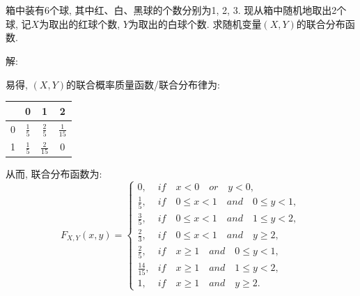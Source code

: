 \documentclass[standard]{ExBook}
\begin{document}
\section{}

\begin{qitems}
    \begin{bbox}
    \begin{shaded}
        \qitem 
箱中装有6个球, 其中红、白、黑球的个数分别为1, 2, 3. 现从箱中随机地取出2个球, 记$X$为取出的红球个数, $Y$为取出的白球个数. 求随机变量$(X,Y)$的联合分布函数.
    \end{shaded}
    \end{bbox}

\vspace{-5em}

    \begin{bbox}
解: 

易得, $(X,Y)$的联合概率质量函数/联合分布律为:
\begin{footnotesize}
\begin{center}
    \renewcommand{\arraystretch}{1.7}
    \setlength{\tabcolsep}{25pt}
    \begin{tabular}{c|c|c|c}
	    \hline
	    \diagbox{$X$}{$P(X,Y)$}{$Y$} & 0 & 1 & 2 \\
	    \hline
	    0 & $\displaystyle\frac{1}{5}$ & $\displaystyle\frac{2}{5}$ & $\displaystyle\frac{1}{15}$\\
	    \hline
	    1 & $\displaystyle\frac{1}{5}$ & $\displaystyle\frac{2}{15}$ & 0\\
	    \hline
    \end{tabular}
\end{center}
\end{footnotesize}
从而, 联合分布函数为:
\[
F_{X,Y}(x, y) = 
\begin{cases} 
0, & if\quad x < 0\quad or\quad y < 0, \\ 
\frac{1}{5}, & if\quad 0 \leq x < 1\quad and\quad 0 \leq y < 1, \\ 
\frac{3}{5}, & if\quad 0 \leq x < 1\quad and\quad 1 \leq y < 2, \\ 
\frac{2}{3}, & if\quad 0 \leq x < 1\quad and\quad y \geq 2, \\ 
\frac{2}{5}, & if\quad x \geq 1\quad and\quad 0 \leq y < 1, \\ 
\frac{14}{15}, & if\quad x \geq 1\quad and\quad 1 \leq y < 2, \\ 
1, & if\quad x \geq 1\quad and\quad y \geq 2. 
\end{cases}
\]
    \end{bbox}


\end{qitems}
\end{document}
